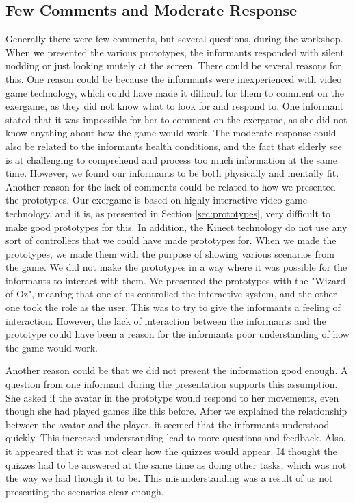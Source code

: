 \subsection{Few Comments and Moderate Response}
Generally there were few comments, but several questions, during the workshop. When we presented the various prototypes, the informants responded with silent nodding or just looking mutely at the screen. There could be several reasons for this. One reason could be because the informants were inexperienced with video game technology, which could have made it difficult for them to comment on the exergame, as they did not know what to look for and respond to. One informant stated that it was impossible for her to comment on the exergame, as she did not know anything about how the game would work. The moderate response could also be related to the informants health conditions, and the fact that elderly see is at challenging to comprehend and process too much information at the same time. However, we found our informants to be both physically and mentally fit. Another reason for the lack of comments could be related to how we presented the prototypes. Our exergame is based on highly interactive video game technology, and it is, as presented in Section \ref{sec:prototypes}, very difficult to make good prototypes for this. In addition, the Kinect technology do not use any sort of controllers that we could have made prototypes for. When we made the prototypes, we made them with the purpose of showing various scenarios from the game. We did not make the prototypes in a way where it was possible for the informants to interact with them. We presented the prototypes with the "Wizard of Oz", meaning that one of us controlled the interactive system, and the other one took the role as the user. This was to try to give the informants a feeling of interaction. However, the lack of interaction between the informants and the prototype could have been a reason for the informants poor understanding of how the game would work. 

Another reason could be that we did not present the information good enough. A question from one informant during the presentation supports this assumption. She asked if the avatar in the prototype would respond to her movements, even though she had played games like this before. After we explained the relationship between the avatar and the player, it seemed that the informants understood quickly. This increased understanding lead to more questions and feedback. Also, it appeared that it was not clear how the quizzes would appear. I4 thought the quizzes had to be answered at the same time as doing other tasks, which was not the way we had though it to be. This misunderstanding was a result of us not presenting the scenarios clear enough.

